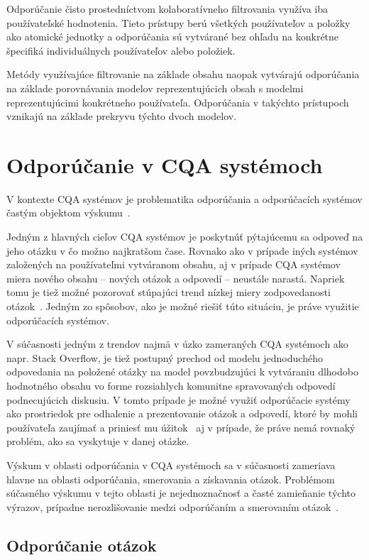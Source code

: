 Odporúčanie čisto prostedníctvom kolaboratívneho filtrovania využíva iba používateľské hodnotenia. Tieto prístupy berú
všetkých používateľov a položky ako atomické jednotky a odporúčania sú vytvárané bez ohľadu na konkrétne špecifiká
individuálnych používateľov alebo položiek.

Metódy využívajúce filtrovanie na základe obsahu naopak vytvárajú
odporúčania na základe porovnávania modelov reprezentujúcich obsah s modelmi reprezentujúcimi konkrétneho používateľa.
Odporúčania v takýchto prístupoch vznikajú na základe prekryvu týchto dvoch modelov.


\section{Odporúčanie v CQA systémoch}

V kontexte CQA systémov je problematika odporúčania a odporúčacích systémov častým objektom výskumu~\cite{Srba2016}.

Jedným z hlavných cieľov CQA systémov je poskytnúť pýtajúcemu sa odpoveď na jeho otázku v čo možno najkratšom čase.
Rovnako ako v prípade iných systémov založených na používateľmi vytváranom obsahu, aj v prípade CQA systémov miera
nového obsahu -- nových otázok a odpovedí -- neustále narastá. Napriek tomu je tiež možné pozorovať stúpajúci trend
nízkej miery zodpovedanosti otázok~\cite{Srba2016SOFail}. Jedným zo spôsobov, ako je možné riešiť túto situáciu,
je práve využitie odporúčacích systémov.

V súčasnosti jedným z trendov najmä v úzko zameraných CQA systémoch ako napr. Stack Overflow, je tiež postupný prechod
od modelu jednoduchého odpovedania na položené otázky na model povzbudzujúci k vytváraniu dlhodobo hodnotného obsahu
vo forme rozsiahlych komunitne spravovaných odpovedí~\cite{Anderson2012,Li2015} podnecujúcich diskusiu.
V tomto prípade je možné využiť odporúčacie systémy ako prostriedok pre odhalenie a prezentovanie otázok a odpovedí,
ktoré by mohli používateľa zaujímať a priniesť mu úžitok~\cite{Toba2014} aj v prípade, že práve nemá rovnaký problém,
ako sa vyskytuje v danej otázke.

Výskum v oblasti odporúčania v CQA systémoch sa v súčasnosti zameriava hlavne na oblasti odporúčania, smerovania
a získavania otázok. Problémom súčasného výskumu v tejto oblasti je nejednoznačnosť a časté zamieňanie týchto výrazov,
prípadne nerozlišovanie medzi odporúčaním a smerovaním otázok~\cite{Srba2016}.

\subsection{Odporúčanie otázok}

